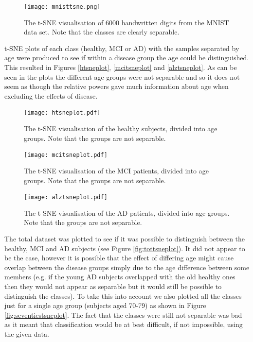 \begin{figure}[h!]
  \centering
    \texttt{[image: mnisttsne.png]}
    \caption{The t-SNE visualisation of 6000 handwritten digits from the MNIST data set.\cite{Maaten2008} Note that the classes are clearly separable.}
    \label{fig:mnisttsne}
\end{figure}


t-SNE plots of each class (healthy, MCI or AD) with the samples separated by age were produced to see if within a disease group the age could be distinguished. This resulted in Figures \ref{htsneplot}, \ref{mcitsneplot} and \ref{alztsneplot}. As can be seen in the plots the different age groups were not separable and so it does not seem as though the relative powers gave much information about age when excluding the effects of disease.


\begin{figure}[h!]
  \centering
    \texttt{[image: htsneplot.pdf]}
    \caption{The t-SNE visualisation of the healthy subjects, divided into age groups. Note that the groups are not separable.}
    \label{fig:htsneplot}
\end{figure}


\begin{figure}[h!]
  \centering
    \texttt{[image: mcitsneplot.pdf]}
    \caption{The t-SNE visualisation of the MCI patients, divided into age groups. Note that the groups are not separable.}
    \label{fig:mcitsneplot}
\end{figure}


\begin{figure}[h!]
  \centering
    \texttt{[image: alztsneplot.pdf]}
    \caption{The t-SNE visualisation of the AD patients, divided into age groups. Note that the groups are not separable.}
    \label{fig:alztsneplot}
\end{figure}


The total dataset was plotted to see if it was possible to distinguish between the healthy, MCI and AD subjects (see Figure \ref{fig:tottsneplot}). It did not appear to be the case, however it is possible that the effect of differing age might cause overlap between the disease groups simply due to the age difference between some members (e.g. if the young AD subjects overlapped with the old healthy ones then they would not appear as separable but it would still be possible to distinguish the classes). To take this into account we also plotted all the classes just for a single age group (subjects aged 70-79) as shown in Figure \ref{fig:seventiestsneplot}. The fact that the classes were still not separable was bad as it meant that classification would be at best difficult, if not impossible, using the given data.


